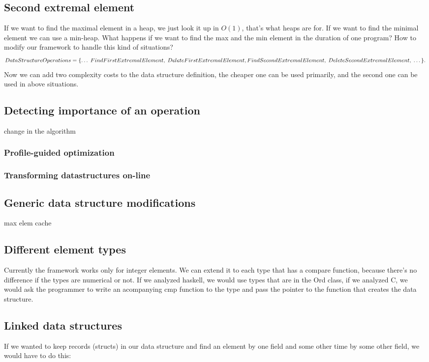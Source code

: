 \documentclass[11pt]{article}
\begin{document}
	\subsection{Second extremal element}
		If we want to find the maximal element in a heap, we just look it up in $O(1)$, that's what heaps are for.
		If we want to find the minimal element we can use a min-heap. What happens if we want to find the max and the min element in the duration of one program?
		How to modify our framework to handle this kind of situations?
		\begin{equation}
		  	DataStructureOperations = \{\dots \; FindFirstExtremalElement,\; DeleteFirstExtremalElement, \; \\
			FindSecondExtremalElement,\; DeleteSecondExtremalElement, \; \dots\}.
		\end{equation}
		Now we can add two complexity costs to the data structure definition, the cheaper one can be used primarily, and the second one can be used in above situations.
	\subsection{Detecting importance of an operation}
		change in the algorithm
		\subsubsection{Profile-guided optimization}
		\subsubsection{Transforming datastructures on-line}
	\subsection{Generic data structure modifications}
		
		max elem cache
	\subsection{Different element types}
		Currently the framework works only for integer elements. We can extend it to each type that has a compare function,
		because there's no difference if the types are numerical or not.
		If we analyzed haskell, we would use types that are in the Ord class,
		if we analyzed C, we would ask the programmer to write an acompanying cmp function to the type and pass the pointer to the function that creates the data structure.
	\subsection{Linked data structures}
		If we wanted to keep records (structs) in our data structure and find an element by one field and some other time by some other field, we would have to do this:
\end{document}
